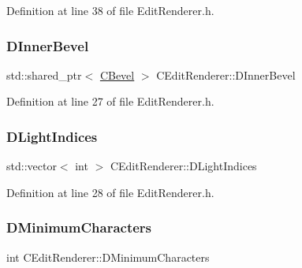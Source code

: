 Definition at line 38 of file Edit\+Renderer.\+h.

\hypertarget{classCEditRenderer_a45b1bf4e9aebe3811c15df1018b8d8da}{}\label{classCEditRenderer_a45b1bf4e9aebe3811c15df1018b8d8da} 
\subsubsection{\texorpdfstring{D\+Inner\+Bevel}{DInnerBevel}}
{\footnotesize\ttfamily std\+::shared\+\_\+ptr$<$ \hyperlink{classCBevel}{C\+Bevel} $>$ C\+Edit\+Renderer\+::\+D\+Inner\+Bevel\hspace{0.3cm}{\ttfamily [protected]}}



Definition at line 27 of file Edit\+Renderer.\+h.

\hypertarget{classCEditRenderer_aa1d5d41e26d759abd3ff5ba8edc4d692}{}\label{classCEditRenderer_aa1d5d41e26d759abd3ff5ba8edc4d692} 
\subsubsection{\texorpdfstring{D\+Light\+Indices}{DLightIndices}}
{\footnotesize\ttfamily std\+::vector$<$ int $>$ C\+Edit\+Renderer\+::\+D\+Light\+Indices\hspace{0.3cm}{\ttfamily [protected]}}



Definition at line 28 of file Edit\+Renderer.\+h.

\hypertarget{classCEditRenderer_ae5d0bd249b2d483c361b0bf9c16c15d3}{}\label{classCEditRenderer_ae5d0bd249b2d483c361b0bf9c16c15d3} 
\subsubsection{\texorpdfstring{D\+Minimum\+Characters}{DMinimumCharacters}}
{\footnotesize\ttfamily int C\+Edit\+Renderer\+::\+D\+Minimum\+Characters\hspace{0.3cm}{\ttfamily [protected]}}



